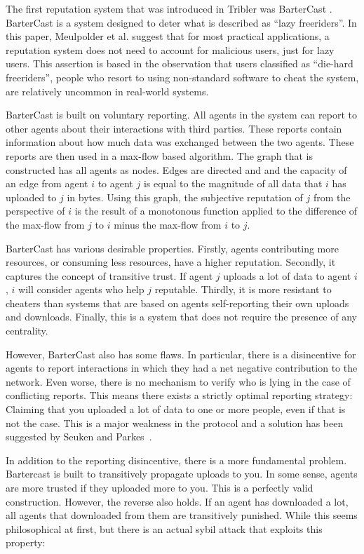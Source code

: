 \documentclass[a4paper,11pt]{book}
\theoremstyle{definition}
\begin{document}
The first reputation system that was introduced in Tribler was BarterCast \cite{meulpolder2009bartercast}.
BarterCast is a system designed to deter what is described as ``lazy freeriders''.
In this paper, Meulpolder et al. suggest that for most practical applications, a reputation system does not
need to account for malicious users, just for lazy users. This assertion is based in the observation
that users classified as ``die-hard freeriders'', people who resort to using non-standard software to
cheat the system, are relatively uncommon in real-world systems. 

BarterCast is built on voluntary reporting. All agents in the system can report to other agents
about their interactions with third parties. These reports contain information about how much data
was exchanged between the two agents. These reports are then used in a max-flow based algorithm.
The graph that is constructed has all agents as nodes. Edges are directed and and the capacity
of an edge from agent $i$ to agent $j$ is equal to the magnitude of all data that $i$ has
uploaded to $j$ in bytes. Using this graph, the subjective reputation of $j$ from the perspective
of $i$ is the result of a monotonous function applied to the difference of the max-flow from $j$ to $i$
minus the max-flow from $i$ to $j$.

BarterCast has various desirable properties. Firstly, agents contributing more resources, or consuming
less resources, have a higher reputation. Secondly, it captures the concept of transitive trust. If agent
$j$ uploads a lot of data to agent $i$, $i$ will consider agents who help $j$ reputable. Thirdly,
it is more resistant to cheaters than systems that are based on agents self-reporting their own uploads and
downloads. Finally, this is a system that does not require the presence of any centrality. 

However, BarterCast also has some flaws. In particular, there is a disincentive for agents to report
interactions in which they had a net negative contribution to the network. Even worse, there is no mechanism
to verify who is lying in the case of conflicting reports. This means there exists a strictly optimal 
reporting strategy: Claiming that you uploaded a lot of data to one or more people, even if that is not
the case. This is a major weakness in the protocol and a solution has been suggested by Seuken and 
Parkes~\cite{seuken2010accounting}. 

In addition to the reporting disincentive, there is a more fundamental problem. Bartercast is built
to transitively propagate uploads to you. In some sense, agents are more trusted if they uploaded
more to you. This is a perfectly valid construction. However, the reverse also holds. If an agent
has downloaded a lot, all agents that downloaded from them are transitively punished. While
this seems philosophical at first, but there is an actual sybil
attack that exploits this property:
\end{document}
